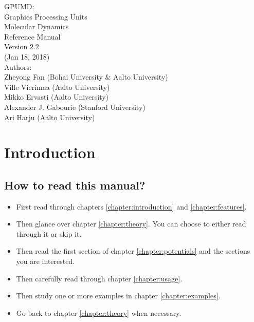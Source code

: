 \documentclass[12pt,a4paper]{report}
\begin{document}
\begin{center}
  \huge
  {
   \vspace*{1.0cm}
   GPUMD: \\
   Graphics Processing Units \\
   Molecular Dynamics\\
   \vspace*{1.0cm}
   Reference Manual\\
   \vspace*{1.0cm}
   Version 2.2\\
   \vspace*{1.0cm}
   (Jan 18, 2018)\\
  \vspace*{2.0cm}
  }
  \large
  {
  Authors: \\
  Zheyong Fan (Bohai University \& Aalto University)\\
  Ville Vierimaa (Aalto University)\\
  Mikko Ervasti (Aalto University)\\
  Alexander J. Gabourie (Stanford University)\\
  Ari Harju (Aalto University)\\
  }
  \vspace*{1.0cm}
\end{center}


\tableofcontents


\chapter{Introduction\label{chapter:introduction}}

\section{How to read this manual?}

\begin{itemize}
\item First read through chapters \ref{chapter:introduction} and \ref{chapter:features}.
\item Then glance over chapter \ref{chapter:theory}. You can choose to either read through it or skip it.
\item Then read the first section of chapter \ref{chapter:potentials} and the sections you are interested.
\item Then carefully read through chapter \ref{chapter:usage}.
\item Then study one or more examples in chapter \ref{chapter:examples}.
\item Go back to chapter \ref{chapter:theory} when necessary.
\end{itemize}
\end{document}
